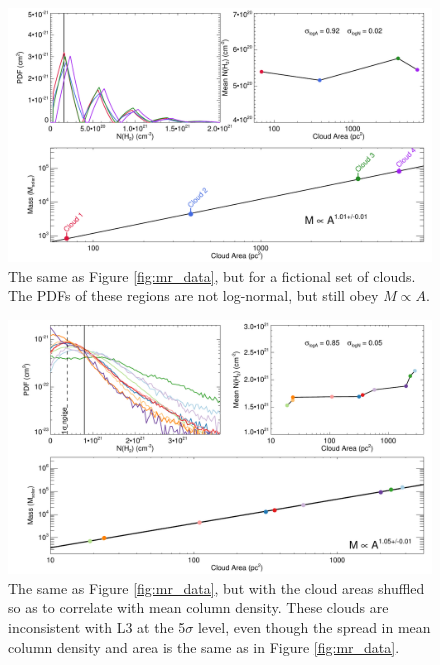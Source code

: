 \begin{figure}
\includegraphics[width=6in]{mr}
\caption{The same as Figure \ref{fig:mr_data}, but for a fictional set of clouds. The PDFs of these regions are not log-normal, but still obey $M \propto A$.}
\label{fig:mr}
\end{figure}

\begin{figure}
\includegraphics[width=6in]{mr_data_correlate}
\caption{The same as Figure \ref{fig:mr_data}, but with the cloud areas shuffled so as to correlate with mean column density. These clouds are inconsistent with L3 at the 5$\sigma$ level, even though the spread in mean column density and area is the same as in Figure \ref{fig:mr_data}.}
\label{fig:mr_correlate}
\end{figure}

